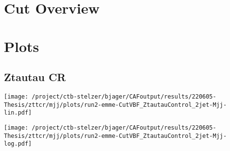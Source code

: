 \documentclass{article}
\begin{document}
\section[Cut Overview]{Cut Overview}

\centering


\section[Plots]{Plots}

\centering

\subsection[Ztautau CR]{Ztautau CR}

\centering

\texttt{[image: /project/ctb-stelzer/bjager/CAFoutput/results/220605-Thesis/zttcr/mjj/plots/run2-emme-CutVBF\_ZtautauControl\_2jet-Mjj-lin.pdf]}

\texttt{[image: /project/ctb-stelzer/bjager/CAFoutput/results/220605-Thesis/zttcr/mjj/plots/run2-emme-CutVBF\_ZtautauControl\_2jet-Mjj-log.pdf]}
\end{document}

